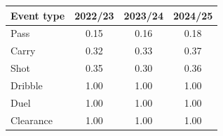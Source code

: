 \begin{tabular}{lccc}
\toprule
Event type & 2022/23 & 2023/24 & 2024/25 \\
\midrule
Pass & 0.15 & 0.16 & 0.18 \\
Carry & 0.32 & 0.33 & 0.37 \\
Shot & 0.35 & 0.30 & 0.36 \\
Dribble & 1.00 & 1.00 & 1.00 \\
Duel & 1.00 & 1.00 & 1.00 \\
Clearance & 1.00 & 1.00 & 1.00 \\
\bottomrule
\end{tabular}
